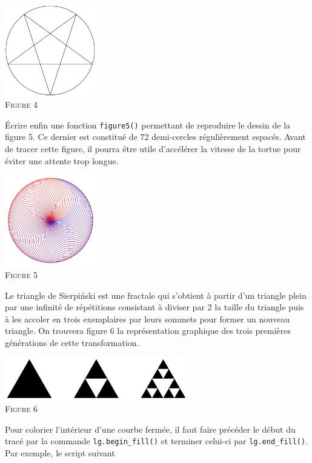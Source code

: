 \documentclass{magnolia}
\begin{document}
\begin{questions}
\begin{center}
\includegraphics[width=0.3\textwidth]{../../Commun/Images/python-tp-logo-4}\\
\textsc{Figure 4}
\end{center} 
\question Écrire enfin une fonction \verb!figure5()! permettant de reproduire
  le dessin de la figure 5. Ce dernier est constitué de 72 demi-cercles
  régulièrement espacés. Avant de tracer cette figure, il pourra être utile d'accélérer la vitesse de la tortue
  pour éviter une attente trop longue.
\begin{center}
\includegraphics[width=0.3\textwidth]{../../Commun/Images/python-tp-logo-5}\\
\textsc{Figure 5}
\end{center}
\enonce Le triangle de Sierpi\'nski est une fractale qui s'obtient à partir d'un triangle plein par une infinité de
  répétitions consistant à diviser par 2 la taille du triangle puis à les accoler en trois exemplaires par leurs
  sommets pour former un nouveau triangle. On trouvera figure 6 la représentation graphique des trois premières
  générations de cette transformation.
\begin{center}
\includegraphics[width=0.6\textwidth]{../../Commun/Images/python-tp-logo-6}\\
\textsc{Figure 6}
\end{center}
Pour colorier l'intérieur d'une courbe fermée, il faut faire précéder le début du tracé par la commande
\verb!lg.begin_fill()! et terminer celui-ci par \verb!lg.end_fill()!. Par exemple, le script suivant

\end{questions}
\end{document}
